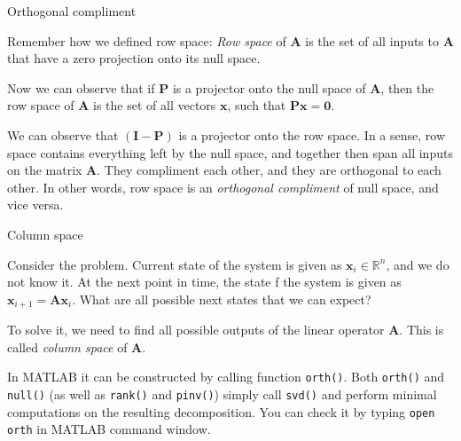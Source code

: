 \documentclass{beamer}
\begin{document}
\begin{frame}{Orthogonal compliment}
\begin{flushleft}

Remember how we defined row space: \emph{Row space} of $\mathbf{A}$ is the set of all inputs to $\mathbf{A}$ that have a zero projection onto its null space.

\bigskip

Now we can observe that if $\mathbf{P}$ is a projector onto the null space of $\mathbf{A}$, then the row space of $\mathbf{A}$ is the set of all vectors $\mathbf{x}$, such that $\mathbf{P}\mathbf{x} = \mathbf{0}$. 

\bigskip

We can observe that $(\mathbf{I} - \mathbf{P})$ is a projector onto the row space. In a sense, row space contains everything left by the null space, and together then span all inputs on the matrix $\mathbf{A}$. They compliment each other, and they are orthogonal to each other. In other words, row space is an \emph{orthogonal compliment} of null space, and vice versa. 

\end{flushleft}
\end{frame}


\begin{frame}{Column space}
\begin{flushleft}

Consider the problem. Current state of the system is given as $\mathbf{x}_i \in \mathbb{R}^n$, and we do not know it. At the next point in time, the state f the system is given as $\mathbf{x}_{i+1} = \mathbf{A} \mathbf{x}_{i}$. What are all possible next states that we can expect?

\bigskip

To solve it, we need to find all possible outputs of the linear operator $\mathbf{A}$. This is called \emph{column space} of $\mathbf{A}$. 

\bigskip

In MATLAB it can be constructed by calling function \texttt{orth()}. Both \texttt{orth()} and \texttt{null()} (as well as \texttt{rank()} and \texttt{pinv()}) simply call \texttt{svd()} and perform minimal computations on the resulting decomposition. You can check it by typing \texttt{open orth} in MATLAB command window.


\end{flushleft}
\end{frame}
\end{document}
